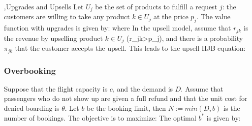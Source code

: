 \documentclass[10pt]{report}
\begin{document}
\sep{Upgrades and Upsells}
Let $U_j$ be the set of products to fulfill a request $j$: the customers are willing to take any product $k\in U_j$ at the price $p_j$. The value function with upgrades is given by:
where
In the upsell model, assume that $r_{jk}$ is the revenue by upselling product $k\in U_j$ (r_{jk}>p_j), and there is a probability $\pi_{jk}$ that the customer accepts the upsell.
This leads to the upsell HJB equation:

\subsubsection{Overbooking} \label{subsubsec:overbooking}
Suppose that the flight capacity is $c$, and the demand is $D$. Assume that passengers who do not show up are given a full refund
and that the unit cost for denied boarding is $\theta$. Let $b$ be the booking limit, then $N:= min(D, b)$ is the number of bookings.
The objective is to maximize:
\eq{
    R(b):=p\mathbb{E}[Z(\min(D,b))]-\theta\mathbb{E}[Z(\min(D,b))-c]^+].
}
The optimal $b^*$ is given by:
\end{document}
